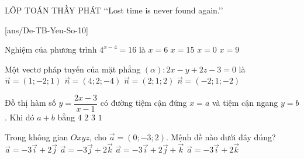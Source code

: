 \begin{name}
	{\tenchude}
	{\tendethi}
	{LỚP TOÁN THẦY PHÁT}
	{\lq\lq Lost time is never found again.\rq\rq}
\end{name}

[ans/De-TB-Yeu-So-10]
\TN
\begin{ex}%
	Nghiệm của phương trình $4^{x-4}=16$ là
	\choice
	{\True $x=6$}
	{$x=15$}
	{$x=0$}
	{$x=9$}
\end{ex}

\begin{ex}%
	Một vectơ pháp tuyến của mặt phẳng $(\alpha)\colon 2x-y+2z-3=0$ là
	\choice
	{$\overrightarrow{n}=(1;-2;1)$}
	{$\overrightarrow{n}=(4;2;-4)$}
	{$\overrightarrow{n}=(2;1;2)$}
	{\True $\overrightarrow{n}=(-2;1;-2)$}
\end{ex}

\begin{ex}%
	Đồ thị hàm số $y=\dfrac{2x-3}{x-1}$ có đường tiệm cận đứng $x=a$ và tiệm cận ngang $y=b$. Khi đó $a+b$ bằng
	\choice
	{$4$}
	{$2$}
	{\True $3$}
	{$1$}
\end{ex}

\begin{ex}%
	Trong không gian $Oxyz$, cho $\overrightarrow{a}=(0;-3;2)$. Mệnh đề nào dưới đây đúng?
	\choice
	{$\overrightarrow{a}=-3\overrightarrow{i}+2\overrightarrow{j}$}
	{\True $\overrightarrow{a}=-3\overrightarrow{j}+2\overrightarrow{k}$}
	{$\overrightarrow{a}=-3\overrightarrow{i}+2\overrightarrow{j}+\overrightarrow{k}$}
	{$\overrightarrow{a}=-3\overrightarrow{i}+2\overrightarrow{k}$}
\end{ex}

